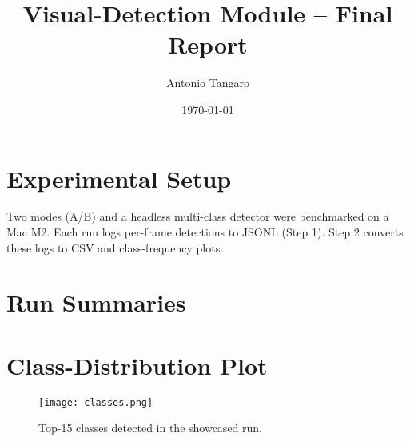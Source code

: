 \documentclass[11pt]{article}
\title{Visual-Detection Module – Final Report}
\author{Antonio Tangaro}
\date{\today}
\begin{document}
\maketitle

\section*{Experimental Setup}
Two modes (A/B) and a headless multi-class detector were benchmarked on a
Mac M2. Each run logs per-frame detections to JSONL (Step 1).  Step 2
converts these logs to CSV and class-frequency plots.

\section*{Run Summaries}

\section*{Class-Distribution Plot}
\begin{figure}[h]
  \centering
  \texttt{[image: classes.png]}
  \caption{Top-15 classes detected in the showcased run.}
\end{figure}
\end{document}
